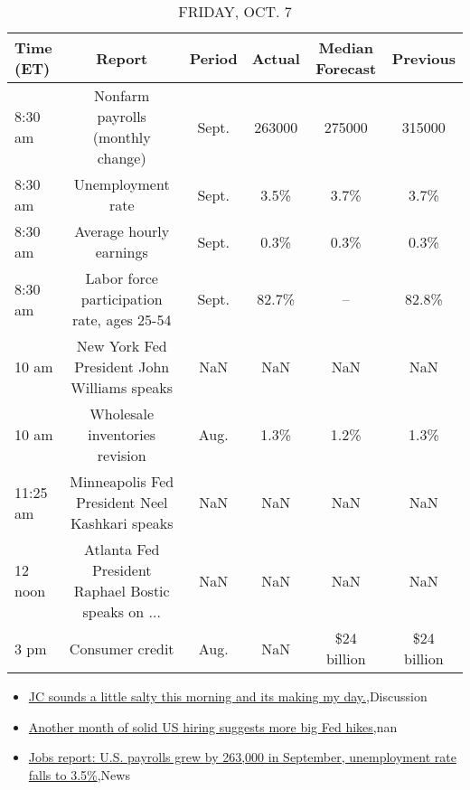 \documentclass{article}%
\begin{document}
\begin{table}[htbp]%
\caption{FRIDAY, OCT. 7}%
\centering%
\begin{adjustbox}{width=1\textwidth}%
\begin{tabular}{lccccc}
\toprule
Time (ET) &                                             Report & Period & Actual & Median Forecast &    Previous \\
\midrule
  8:30 am &                  Nonfarm payrolls (monthly change) &  Sept. & 263000 &          275000 &      315000 \\
  8:30 am &                                  Unemployment rate &  Sept. &   3.5\% &            3.7\% &        3.7\% \\
  8:30 am &                            Average hourly earnings &  Sept. &   0.3\% &            0.3\% &        0.3\% \\
  8:30 am &         Labor force participation rate, ages 25-54 &  Sept. &  82.7\% &              -- &       82.8\% \\
    10 am &        New York Fed President John Williams speaks &    NaN &    NaN &             NaN &         NaN \\
    10 am &                     Wholesale inventories revision &   Aug. &   1.3\% &            1.2\% &        1.3\% \\
 11:25 am &     Minneapolis Fed President Neel Kashkari speaks &    NaN &    NaN &             NaN &         NaN \\
  12 noon & Atlanta Fed President Raphael Bostic speaks on ... &    NaN &    NaN &             NaN &         NaN \\
     3 pm &                                    Consumer credit &   Aug. &    NaN &     \$24 billion & \$24 billion \\
\bottomrule
\end{tabular}
%
\end{adjustbox}%
\end{table}

%
\begin{itemize}%
\item%
\href{https://reddit.com/r/StockMarket/comments/xxz17t/jc\_sounds\_a\_little\_salty\_this\_morning\_and\_its/}{JC sounds a little salty this morning and its making my day.},Discussion%
\item%
\href{https://reddit.com/r/Economics/comments/xy0eym/another\_month\_of\_solid\_us\_hiring\_suggests\_more/}{Another month of solid US hiring suggests more big Fed hikes},nan%
\item%
\href{https://reddit.com/r/Economics/comments/xxy14n/jobs\_report\_us\_payrolls\_grew\_by\_263000\_in/}{Jobs report: U.S. payrolls grew by 263,000 in September, unemployment rate falls to 3.5\%},News%
\end{itemize}%
\end{document}
